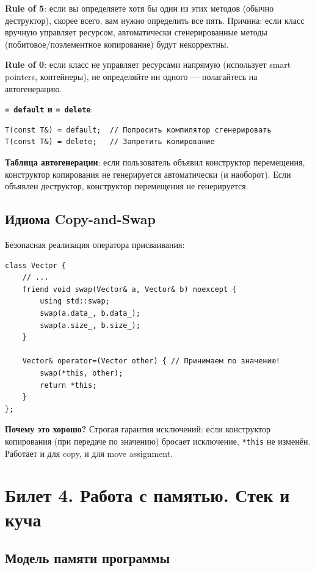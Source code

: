 \documentclass[12pt,a4paper]{article}
\begin{document}
\textbf{Rule of 5}: если вы определяете хотя бы один из этих методов (обычно деструктор), скорее всего, вам нужно определить все пять. Причина: если класс вручную управляет ресурсом, автоматически сгенерированные методы (побитовое/поэлементное копирование) будут некорректны.

\textbf{Rule of 0}: если класс не управляет ресурсами напрямую (использует smart pointers, контейнеры), не определяйте ни одного --- полагайтесь на автогенерацию.

\textbf{\texttt{= default} и \texttt{= delete}}:
\begin{lstlisting}
T(const T&) = default;  // Попросить компилятор сгенерировать
T(const T&) = delete;   // Запретить копирование
\end{lstlisting}

\textbf{Таблица автогенерации}: если пользователь объявил конструктор перемещения, конструктор копирования не генерируется автоматически (и наоборот). Если объявлен деструктор, конструктор перемещения не генерируется.

\subsection{Идиома Copy-and-Swap}

Безопасная реализация оператора присваивания:
\begin{lstlisting}
class Vector {
    // ...
    friend void swap(Vector& a, Vector& b) noexcept {
        using std::swap;
        swap(a.data_, b.data_);
        swap(a.size_, b.size_);
    }

    Vector& operator=(Vector other) { // Принимаем по значению!
        swap(*this, other);
        return *this;
    }
};
\end{lstlisting}
\textbf{Почему это хорошо?} Строгая гарантия исключений: если конструктор копирования (при передаче по значению) бросает исключение, \texttt{*this} не изменён. Работает и для copy, и для move assignment.

\section{Билет 4. Работа с памятью. Стек и куча}

\subsection{Модель памяти программы}
\end{document}
